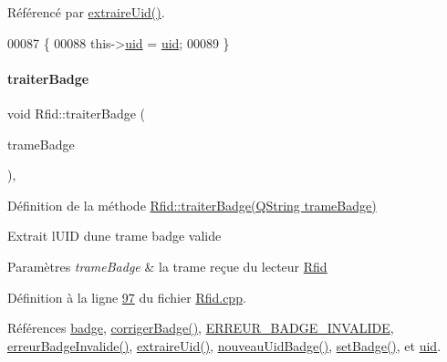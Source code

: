 Référencé par \hyperlink{_rfid_8cpp_source_l00130}{extraire\+Uid()}.


\begin{DoxyCode}
00087 \{
00088     this->\hyperlink{class_rfid_a157b71d282a7e067c65b431dbae6c6c8}{uid} = \hyperlink{class_rfid_a157b71d282a7e067c65b431dbae6c6c8}{uid};
00089 \}
\end{DoxyCode}
\mbox{\label{class_rfid_a5b4f31b235afebee620e42c52ab60213}} 
\paragraph{\texorpdfstring{traiter\+Badge}{traiterBadge}}
{\footnotesize\ttfamily void Rfid\+::traiter\+Badge (\begin{DoxyParamCaption}\item[{Q\+String}]{trame\+Badge }\end{DoxyParamCaption})\hspace{0.3cm}{\ttfamily [private]}, {\ttfamily [slot]}}



Définition de la méthode \hyperlink{class_rfid_a5b4f31b235afebee620e42c52ab60213}{Rfid\+::traiter\+Badge(\+Q\+String trame\+Badge)} 

Extrait l\textquotesingle{}U\+ID d\textquotesingle{}une trame badge valide 
\begin{DoxyParams}{Paramètres}
{\em trame\+Badge} & la trame reçue du lecteur \hyperlink{class_rfid}{Rfid} \\
\hline
\end{DoxyParams}


Définition à la ligne \hyperlink{_rfid_8cpp_source_l00097}{97} du fichier \hyperlink{_rfid_8cpp_source}{Rfid.\+cpp}.



Références \hyperlink{_rfid_8h_source_l00056}{badge}, \hyperlink{_rfid_8cpp_source_l00043}{corriger\+Badge()}, \hyperlink{_rfid_8h_source_l00018}{E\+R\+R\+E\+U\+R\+\_\+\+B\+A\+D\+G\+E\+\_\+\+I\+N\+V\+A\+L\+I\+DE}, \hyperlink{class_rfid_a896a20a2fbe2ac7d842456a1161717cb}{erreur\+Badge\+Invalide()}, \hyperlink{_rfid_8cpp_source_l00130}{extraire\+Uid()}, \hyperlink{class_rfid_a76990ba3147098e80ac6fc67af6439d1}{nouveau\+Uid\+Badge()}, \hyperlink{_rfid_8cpp_source_l00075}{set\+Badge()}, et \hyperlink{_rfid_8h_source_l00057}{uid}.


